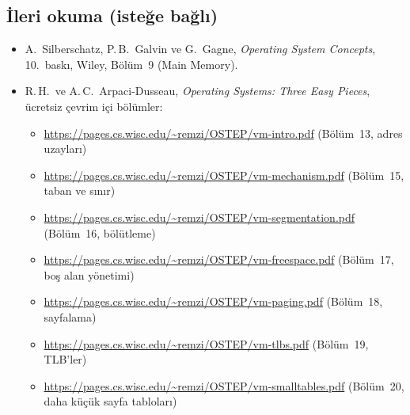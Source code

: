 \documentclass[11pt,a4paper]{article}
\begin{document}
\subsection*{İleri okuma (isteğe bağlı)}
\begin{itemize}
  \item A.\ Silberschatz, P.\,B.\ Galvin ve G.\ Gagne, \emph{Operating System Concepts}, 10.\ baskı, Wiley, Bölüm~9 (Main Memory).
  \item R.\,H.\ ve A.\,C.\ Arpaci-Dusseau, \emph{Operating Systems: Three Easy Pieces}, ücretsiz çevrim içi bölümler:
  \begin{itemize}
    \item \url{https://pages.cs.wisc.edu/~remzi/OSTEP/vm-intro.pdf} (Bölüm~13, adres uzayları)
    \item \url{https://pages.cs.wisc.edu/~remzi/OSTEP/vm-mechanism.pdf} (Bölüm~15, taban ve sınır)
    \item \url{https://pages.cs.wisc.edu/~remzi/OSTEP/vm-segmentation.pdf} (Bölüm~16, bölütleme)
    \item \url{https://pages.cs.wisc.edu/~remzi/OSTEP/vm-freespace.pdf} (Bölüm~17, boş alan yönetimi)
    \item \url{https://pages.cs.wisc.edu/~remzi/OSTEP/vm-paging.pdf} (Bölüm~18, sayfalama)
    \item \url{https://pages.cs.wisc.edu/~remzi/OSTEP/vm-tlbs.pdf} (Bölüm~19, TLB'ler)
    \item \url{https://pages.cs.wisc.edu/~remzi/OSTEP/vm-smalltables.pdf} (Bölüm~20, daha küçük sayfa tabloları)
  \end{itemize}
\end{itemize}
\end{document}
